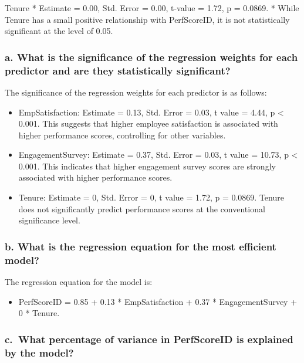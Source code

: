 \documentclass[
]{article}
\providecommand{\tightlist}{%
  \setlength{\itemsep}{0pt}\setlength{\parskip}{0pt}}
\begin{document}
Tenure * Estimate = 0.00, Std. Error = 0.00, t-value = 1.72, p = 0.0869.
* While Tenure has a small positive relationship with PerfScoreID, it is
not statistically significant at the level of 0.05.

\subsubsection{a. What is the significance of the regression weights for
each predictor and are they statistically
significant?}\label{a.-what-is-the-significance-of-the-regression-weights-for-each-predictor-and-are-they-statistically-significant-1}

The significance of the regression weights for each predictor is as
follows:

\begin{itemize}
\tightlist
\item
  EmpSatisfaction: Estimate = 0.13, Std. Error = 0.03, t value = 4.44, p
  \textless{} 0.001. This suggests that higher employee satisfaction is
  associated with higher performance scores, controlling for other
  variables.
\item
  EngagementSurvey: Estimate = 0.37, Std. Error = 0.03, t value = 10.73,
  p \textless{} 0.001. This indicates that higher engagement survey
  scores are strongly associated with higher performance scores.
\item
  Tenure: Estimate = 0, Std. Error = 0, t value = 1.72, p = 0.0869.
  Tenure does not significantly predict performance scores at the
  conventional significance level.
\end{itemize}

\subsubsection{b. What is the regression equation for the most efficient
model?}\label{b.-what-is-the-regression-equation-for-the-most-efficient-model}

The regression equation for the model is:

\begin{itemize}
\tightlist
\item
  PerfScoreID = 0.85 + 0.13 * EmpSatisfaction + 0.37 * EngagementSurvey
  + 0 * Tenure.
\end{itemize}

\subsubsection{c.~What percentage of variance in PerfScoreID is
explained by the
model?}\label{c.-what-percentage-of-variance-in-perfscoreid-is-explained-by-the-model}
\end{document}
